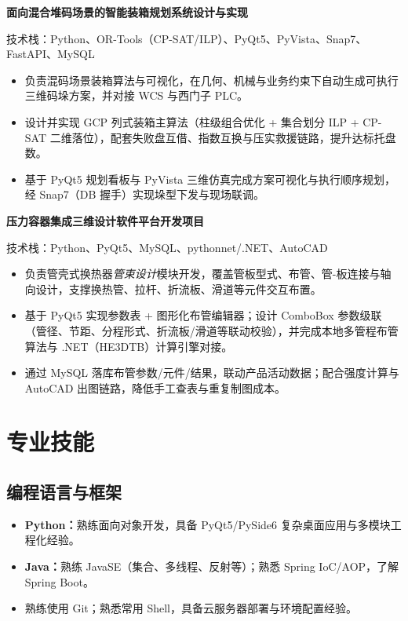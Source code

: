 \documentclass[UTF8]{ctexart}
\newcommand{\projectItem}[2]{
    \noindent
    \textbf{#1} \hfill #2
    \vspace{0.05em}
}
\begin{document}
\vspace{0.12em}

\projectItem{面向混合堆码场景的智能装箱规划系统设计与实现}{}
{\small 技术栈：Python、OR-Tools（CP-SAT/ILP）、PyQt5、PyVista、Snap7、FastAPI、MySQL}
\begin{itemize}
    \item 负责混码场景装箱算法与可视化，在几何、机械与业务约束下自动生成可执行三维码垛方案，并对接 WCS 与西门子 PLC。
    \item 设计并实现 GCP 列式装箱主算法（柱级组合优化 + 集合划分 ILP + CP-SAT 二维落位），配套失败盘互借、指数互换与压实救援链路，提升达标托盘数。
    \item 基于 PyQt5 规划看板与 PyVista 三维仿真完成方案可视化与执行顺序规划，经 Snap7（DB 握手）实现垛型下发与现场联调。
\end{itemize}

\vspace{0.12em}

\projectItem{压力容器集成三维设计软件平台开发项目}{}
{\small 技术栈：Python、PyQt5、MySQL、pythonnet/.NET、AutoCAD}
\begin{itemize}
    \item 负责管壳式换热器\emph{管束设计}模块开发，覆盖管板型式、布管、管-板连接与轴向设计，支撑换热管、拉杆、折流板、滑道等元件交互布置。
    \item 基于 PyQt5 实现参数表 + 图形化布管编辑器；设计 ComboBox 参数级联（管径、节距、分程形式、折流板/滑道等联动校验），并完成本地多管程布管算法与 .NET（HE3DTB）计算引擎对接。
    \item 通过 MySQL 落库布管参数/元件/结果，联动产品活动数据；配合强度计算与 AutoCAD 出图链路，降低手工查表与重复制图成本。
\end{itemize}

\section*{专业技能}

\subsection*{编程语言与框架}
\begin{itemize}
    \item \textbf{Python：}熟练面向对象开发，具备 PyQt5/PySide6 复杂桌面应用与多模块工程化经验。
    \item \textbf{Java：}熟练 JavaSE（集合、多线程、反射等）；熟悉 Spring IoC/AOP，了解 Spring Boot。
    \item 熟练使用 Git；熟悉常用 Shell，具备云服务器部署与环境配置经验。
\end{itemize}
\end{document}
